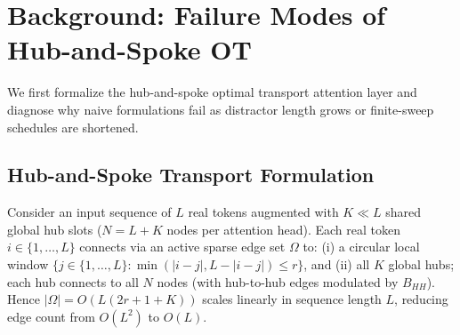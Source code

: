 \documentclass[11pt]{article}
\begin{document}
\section{Background: Failure Modes of Hub-and-Spoke OT}
\label{sec:background}

We first formalize the hub-and-spoke optimal transport attention layer and diagnose why naive formulations fail as distractor length grows or finite-sweep schedules are shortened.

\subsection{Hub-and-Spoke Transport Formulation}

Consider an input sequence of $L$ real tokens augmented with $K \ll L$ shared global hub slots ($N = L + K$ nodes per attention head). Each real token $i \in \{1,\dots,L\}$ connects via an active sparse edge set $\Omega$ to: (i) a circular local window $\{j \in \{1,\dots,L\} : \min(|i-j|, L - |i-j|) \le r\}$, and (ii) all $K$ global hubs; each hub connects to all $N$ nodes (with hub-to-hub edges modulated by $B_{HH}$). Hence $|\Omega| = O(L(2r + 1 + K))$ scales linearly in sequence length $L$, reducing edge count from $O(L^2)$ to $O(L)$.
\end{document}
